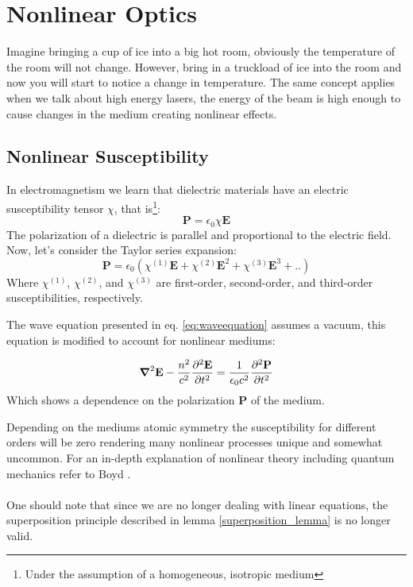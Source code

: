 \documentclass{article}
\begin{document}
\section{Nonlinear Optics}
Imagine bringing a cup of ice into a big hot room, obviously the temperature of the room will not change. However, bring in a truckload of ice into the room and now you will start to notice a change in temperature.
The same concept applies when we talk about high energy lasers, the energy of the beam is high enough to cause changes in the medium creating nonlinear effects.
\nocite{boyd_2020}
\subsection{Nonlinear Susceptibility}
In electromagnetism we learn that dielectric materials have an electric susceptibility tensor $\chi$, that is\footnote[1]{Under the assumption of a homogeneous, isotropic medium}:
\begin{equation}
    \textbf{P} = \epsilon_0 \chi \textbf{E}
\end{equation}
The polarization of a dielectric is parallel and proportional to the electric field.
Now, let's consider the Taylor series expansion:
\begin{equation}
    \textbf{P} = \epsilon_0 (\chi^{(1)} \textbf{E} + \chi^{(2)} \textbf{E}^2 + \chi^{(3)} \textbf{E}^3 + ..)
\end{equation}
Where $\chi^{(1)}$, $\chi^{(2)}$, and $\chi^{(3)}$ are first-order, second-order, and third-order susceptibilities, respectively.

The wave equation presented in eq. \ref{eq:waveequation} assumes a vacuum, this equation is modified to account for nonlinear mediums:

\begin{equation}
    \grad^2\textbf{E} - \frac{n^2}{c^2}\frac{\partial^2\textbf{E}}{\partial t^2} = \frac{1}{\epsilon_0 c^2}\frac{\partial^2 \textbf{P}}{\partial t^2}
\end{equation}
Which shows a dependence on the polarization $\textbf{P}$ of the medium.

Depending on the mediums atomic symmetry the susceptibility for different orders will be zero rendering many nonlinear processes unique and somewhat uncommon. For an in-depth explanation of nonlinear theory including quantum mechanics refer to Boyd \cite{boyd_2020}.
\\
\ 
\\
One should note that since we are no longer dealing with linear equations, the superposition principle described in lemma \ref{superposition_lemma} is no longer valid.
\end{document}
